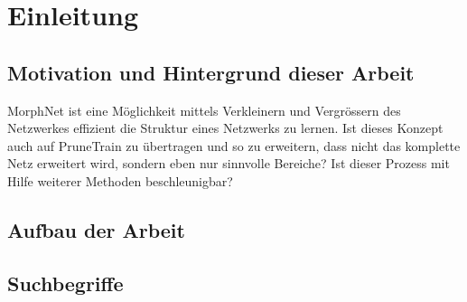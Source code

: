 \chapter{Einleitung}
\label{sec:EinleitungGesamt}

\section{Motivation und Hintergrund dieser Arbeit}


MorphNet ist eine Möglichkeit mittels Verkleinern und Vergrössern des Netzwerkes effizient die Struktur eines Netzwerks zu lernen. Ist dieses Konzept auch auf PruneTrain zu übertragen und so zu erweitern, dass nicht das komplette Netz erweitert wird, sondern eben nur sinnvolle Bereiche?
Ist dieser Prozess mit Hilfe weiterer Methoden beschleunigbar?


\section{Aufbau der Arbeit}


\section{Suchbegriffe}
